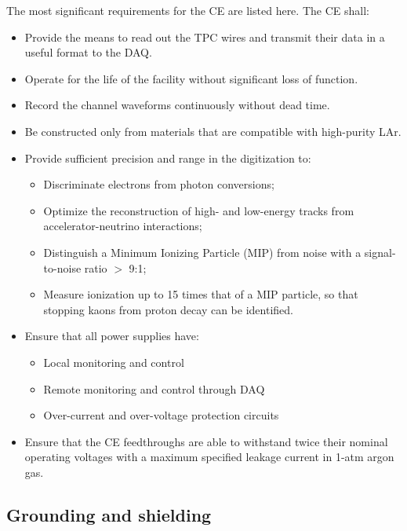 

The most significant requirements for the CE are listed here. The CE shall:

\begin{itemize}	
\item Provide the means to read out the TPC wires and transmit their data in a useful format to the DAQ.
\item Operate for the life of the facility without significant loss of function.
\item Record the channel waveforms continuously without dead time.
\item Be constructed only from materials that are compatible with high-purity LAr.
\item Provide sufficient precision and range in the digitization to:
\begin{itemize}
\item Discriminate electrons from photon conversions;
\item Optimize the reconstruction of high- and low-energy tracks from accelerator-neutrino interactions;
\item Distinguish a Minimum Ionizing Particle (MIP) from noise with a signal-to-noise ratio $>$ 9:1;
\item Measure  ionization up to 15 times that of a MIP particle, so that stopping kaons from proton decay can be identified.
\end{itemize}
\item Ensure that all power supplies have: 
\begin{itemize}
\item Local monitoring and control
\item Remote monitoring and control through DAQ
\item Over-current and over-voltage protection circuits
\end{itemize}
\item Ensure that the CE feedthroughs are able to withstand twice their nominal operating voltages 
with a maximum specified leakage current in 1-atm argon gas.
\end{itemize}


\subsection{Grounding and shielding}
\label{subsec:groundshield}

